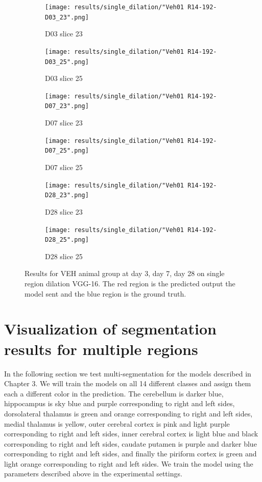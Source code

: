 \begin{figure}[!htb]  
    \centering %
\begin{subfigure}{0.35\textwidth}
  \texttt{[image: results/single\_dilation/"Veh01 R14-192-D03\_23".png]}
  \caption{D03 slice 23}
\end{subfigure}\hfil %
\begin{subfigure}{0.35\textwidth}
  \texttt{[image: results/single\_dilation/"Veh01 R14-192-D03\_25".png]}
  \caption{D03 slice 25}
\end{subfigure}

\medskip
\begin{subfigure}{0.35\textwidth}
  \texttt{[image: results/single\_dilation/"Veh01 R14-192-D07\_23".png]}
  \caption{D07 slice 23}
\end{subfigure}\hfil %
\begin{subfigure}{0.35\textwidth}
  \texttt{[image: results/single\_dilation/"Veh01 R14-192-D07\_25".png]}
  \caption{D07 slice 25}
\end{subfigure}

\medskip
\begin{subfigure}{0.35\textwidth}
  \texttt{[image: results/single\_dilation/"Veh01 R14-192-D28\_23".png]}
  \caption{D28 slice 23}
\end{subfigure}\hfil %
\begin{subfigure}{0.35\textwidth}
  \texttt{[image: results/single\_dilation/"Veh01 R14-192-D28\_25".png]}
  \caption{D28 slice 25}
\end{subfigure}
  
  \caption{Results for VEH animal group at day 3, day 7, day 28 on single region dilation VGG-16. The red region is the predicted output the model sent and the blue region is the ground truth. }
  \label{fig:results_single_dilation_VEH}
\end{figure}


\section{Visualization of segmentation results for multiple regions}
In the following section we test multi-segmentation for the models described in Chapter 3. 
We will train the models on all 14 different classes and assign them each a different color in the prediction.
The cerebellum is darker blue, hippocampus is sky blue and purple corresponding to right and left sides, dorsolateral thalamus is green and orange corresponding to right and left sides, medial thalamus is yellow, outer cerebral cortex is pink and light purple corresponding to right and left sides, inner cerebral cortex is light blue and black corresponding to right and left sides, caudate putamen is purple and darker blue corresponding to right and left sides, and finally the piriform cortex is green and light orange corresponding to right and left sides.
We train the model using the parameters described above in the experimental settings.


